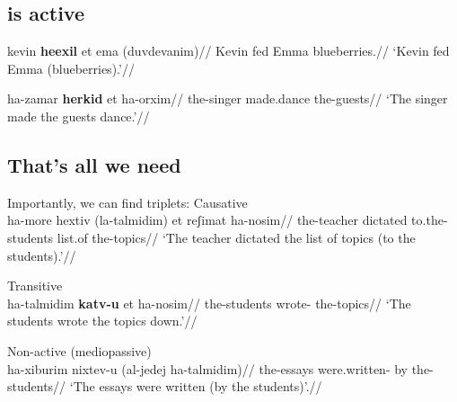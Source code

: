 	\subsection{{\thif} is active}
\pex
	\a \begingl
		\gla kevin \textbf{heexil} et ema (duvdevanim)//
		\glb Kevin fed  Emma blueberries.//
		\glft `Kevin fed Emma (blueberries).'//
	\endgl %
		
	\a \begingl
		\gla ha-zamar \textbf{herkid} et ha-orxim//
		\glb the-singer made.dance  the-guests//
		\glft `The singer made the guests dance.'//
	\endgl
\xe

\newpage
	\subsection{That's all we need}
\pex Importantly, we can find triplets:
	\a Causative {\thif}\\
		\begingl
		\gla ha-more hextiv (la-talmidim) et reʃimat ha-nosim//
		\glb the-teacher dictated to.the-students  list.of the-topics//
		\glft `The teacher dictated the list of topics (to the students).'//
	\endgl
	
	\a Transitive {\tkal}\\
		\begingl
		\gla ha-talmidim \textbf{katv-u} et ha-nosim//
		\glb the-students wrote-  the-topics//
		\glft `The students wrote the topics down.'//
	\endgl
	
	\a Non-active (mediopassive) {\tnif}\\
		\begingl
		\gla ha-xiburim nixtev-u (al-jedej ha-talmidim)//
		\glb the-essays were.written- by the-students//
		\glft `The essays were written (by the students)'.//
	\endgl
\xe


